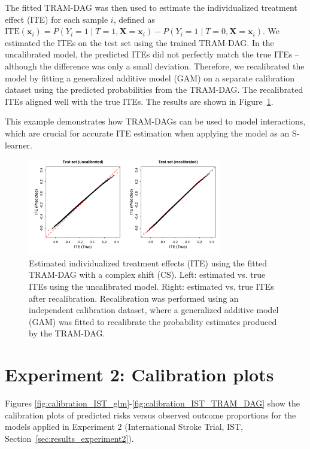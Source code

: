 The fitted TRAM-DAG was then used to estimate the individualized treatment effect (ITE) for each sample $i$, defined as $\text{ITE}(\mathbf{x}_i) = P(Y_i = 1 \mid T = 1, \mathbf{X} = \mathbf{x}_i) - P(Y_i = 1 \mid T = 0, \mathbf{X} = \mathbf{x}_i)$. We estimated the ITEs on the test set using the trained TRAM-DAG. In the uncalibrated model, the predicted ITEs did not perfectly match the true ITEs -- although the difference was only a small deviation. Therefore, we recalibrated the model by fitting a generalized additive model (GAM) on a separate calibration dataset using the predicted probabilities from the TRAM-DAG. The recalibrated ITEs aligned well with the true ITEs. The results are shown in Figure~\ref{fig:ITE_interaction}.

This example demonstrates how TRAM-DAGs can be used to model interactions, which are crucial for accurate ITE estimation when applying the model as an S-learner.


\begin{figure}[htbp]
\centering
\includegraphics[width=0.75\textwidth]{img/appendix_ITE_recal.png}
\caption{Estimated individualized treatment effects (ITE) using the fitted TRAM-DAG with a complex shift (CS). Left: estimated vs. true ITEs using the uncalibrated model. Right: estimated vs. true ITEs after recalibration. Recalibration was performed using an independent calibration dataset, where a generalized additive model (GAM) was fitted to recalibrate the probability estimates produced by the TRAM-DAG.}
\label{fig:ITE_interaction}
\end{figure}



\section{Experiment 2: Calibration plots} \label{sec:calibrations_experiment2}

Figures \ref{fig:calibration_IST_glm}-\ref{fig:calibration_IST_TRAM_DAG} show the calibration plots of predicted risks versus observed outcome proportions for the models applied in Experiment 2 (International Stroke Trial, IST,  Section~\ref{sec:results_experiment2}).


